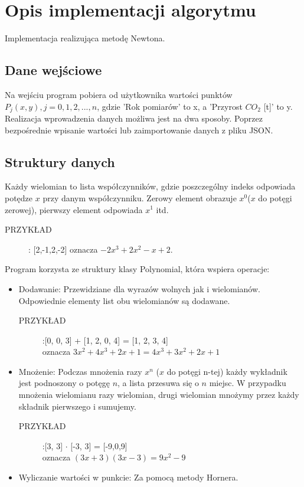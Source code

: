 \documentclass[12pt]{article}
\begin{document}
\section{Opis implementacji algorytmu}
Implementacja realizująca metodę Newtona.
\subsection{Dane wejściowe}
Na wejściu program pobiera od użytkownika wartości punktów \\$P_{j}(x,y), j=0,1,2,...,n$, gdzie 'Rok pomiarów' to x, a 'Przyrost $ CO_{2}$ [t]' to y. Realizacja wprowadzenia danych możliwa jest na dwa sposoby. Poprzez bezpośrednie wpisanie wartości lub zaimportowanie danych z pliku JSON.
\subsection{Struktury danych}
Każdy wielomian to lista współczynników, gdzie poszczególny indeks odpowiada potędze $x$ przy danym współczynniku. Zerowy element obrazuje $ x^{0} $($x$ do potęgi zerowej), pierwszy element odpowiada $ x^{1} $ itd. 
\begin{description}
 
 \item[PRZYKŁAD]:\hspace{5 mm}  [2,-1,2,-2] oznacza $-2x^{3} + 2x^{2} - x + 2$.
 \\
\end{description}
Program korzysta ze struktury klasy Polynomial, która wspiera operacje:
\begin{itemize}
 \item Dodawanie: Przewidziane dla wyrazów wolnych jak i wielomianów. Odpowiednie elementy list obu wielomianów są dodawane.
 \begin{description}
 
 \item[PRZYKŁAD]:\hspace{5 mm}[0, 0, 3] + [1, 2, 0, 4] = [1, 2, 3, 4] \\ oznacza 
  $3x^2 + 4x^{3}+2x+1 = 4x^{3}+3x^{2}+2x+1 $
   \end{description}
 \item Mnożenie: Podczas mnożenia razy $x^{n}$ ($x$ do potęgi n-tej) każdy wykładnik jest podnoszony o potęgę $n$, a lista przesuwa się o $n$ miejsc. W przypadku mnożenia wielomianu razy wielomian, drugi wielomian mnożymy przez każdy składnik pierwszego i sumujemy.
 \begin{description}
 
\item[PRZYKŁAD]:\hspace{5 mm}[3, 3] $\cdot$ [-3, 3] = [-9,0,9] \\ oznacza $(3x + 3)(3x - 3) = 9x^{2} - 9$
 \end{description}
 \item Wyliczanie wartości w punkcie: Za pomocą metody Hornera.
\end{itemize}
\end{document}
